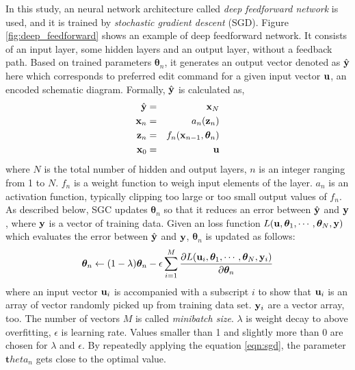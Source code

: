 \documentclass[twocolumn]{article}
\begin{document}
In this study, an neural network architecture called
{\it deep feedforward network} is used,
and it is trained by {\it stochastic gradient descent} (SGD)\cite{mit}.
Figure \ref{fig:deep_feedforward} shows an example of deep feedforward network.
It consists of an input layer, some hidden layers and an output layer,
without a feedback path.
Based on trained parameters ${\bm \theta}_n$,
it generates an output vector denoted as $\hat{\bf y}$ here
which corresponds to preferred edit command for a given input vector
${\bf u}$, an encoded schematic diagram.
Formally, $\hat{\bf y}$ is calculated as,
\begin{eqnarray}
\hat{\bf y} &=& {\bf x}_N \\
{\bf x}_n &=& a_n({\bf z}_n) \\
{\bf z}_n &=& f_n({\bf x}_{n-1}, {\bm \theta}_n)\\
{\bf x}_0 &=& {\bf u}
\end{eqnarray}
where $N$ is the total number of hidden and output layers,
$n$ is an integer ranging from 1 to $N$.
$f_n$ is a weight function to weigh input elements of the layer.
$a_n$ is an activation function,
typically clipping too large or too small output values of $f_n$.
As described below,
SGC updates ${\bm \theta}_n$ so that it reduces an error
between $\hat{\bf y}$ and ${\bf y}$,
where ${\bf y}$ is a vector of training data.
Given an loss function
$L({\bf u},{\bm \theta}_1,\cdots,{\bm \theta}_N,{\bf y})$
which evaluates the error between $\hat{\bf y}$ and ${\bf y}$,
${\bm \theta}_n$ is updated as follows:
\begin{eqnarray}
{\bm \theta}_n \leftarrow
(1-\lambda){\bm \theta}_n
- \epsilon
  \sum_{i=1}^M
  \frac{\partial L({\bf u}_i,{\bm \theta}_1,\cdots,{\bm \theta}_N,{\bf y}_i)}
       {\partial {\bm \theta}_n}\label{eqn:sgd}
\end{eqnarray}
where an input vector ${\bf u}_i$ is accompanied with a subscript $i$
to show that ${\bf u}_i$ is an array of vector randomly picked up
from training data set.
${\bf y}_i$ are a vector array, too.
The number of vectors $M$ is called {\it minibatch size}.
$\lambda$ is weight decay to above overfitting,
$\epsilon$ is learning rate.
Values smaller than 1 and slightly more than 0 are chosen
for $\lambda$ and $\epsilon$.
By repeatedly applying the equation \ref{eqn:sgd},
the parameter ${\bm theta}_n$ gets close to the optimal value.
\end{document}

